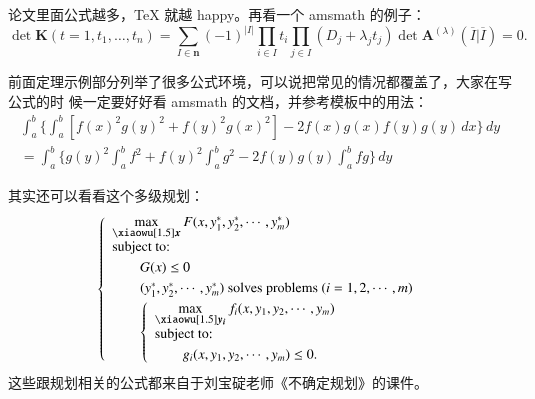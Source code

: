 论文里面公式越多，\TeX{} 就越 happy。再看一个 \textsf{amsmath} 的例子：
\newcommand{\envert}[1]{\left\lvert#1\right\rvert} 
\begin{equation}\label{detK2}
\det\mathbf{K}(t=1,t_1,\dots,t_n)=\sum_{I\in\mathbf{n}}(-1)^{\envert{I}}
\prod_{i\in I}t_i\prod_{j\in I}(D_j+\lambda_jt_j)\det\mathbf{A}
^{(\lambda)}(\overline{I}|\overline{I})=0.
\end{equation} 

前面定理示例部分列举了很多公式环境，可以说把常见的情况都覆盖了，大家在写公式的时
候一定要好好看 \textsf{amsmath} 的文档，并参考模板中的用法：
\begin{multline*}%
\int_a^b\biggl\{\int_a^b[f(x)^2g(y)^2+f(y)^2g(x)^2]
 -2f(x)g(x)f(y)g(y)\,dx\biggr\}\,dy \\
 =\int_a^b\biggl\{g(y)^2\int_a^bf^2+f(y)^2
  \int_a^b g^2-2f(y)g(y)\int_a^b fg\biggr\}\,dy
\end{multline*}

其实还可以看看这个多级规划：
\begin{equation}\label{bilevel}
\left\{\begin{array}{l}
\max\limits_{{\mbox{\footnotesize\boldmath $x$}}} F(x,y_1^*,y_2^*,\cdots,y_m^*)\\[0.2cm]
\mbox{subject to:}\\[0.1cm]
\qquad G(x)\le 0\\[0.1cm]
\qquad(y_1^*,y_2^*,\cdots,y_m^*)\mbox{ solves problems }(i=1,2,\cdots,m)\\[0.1cm]
\qquad\left\{\begin{array}{l}
    \max\limits_{{\mbox{\footnotesize\boldmath $y_i$}}}f_i(x,y_1,y_2,\cdots,y_m)\\[0.2cm]
    \mbox{subject to:}\\[0.1cm]
    \qquad g_i(x,y_1,y_2,\cdots,y_m)\le 0.
    \end{array}\right.
\end{array}\right.
\end{equation}
这些跟规划相关的公式都来自于刘宝碇老师《不确定规划》的课件。
